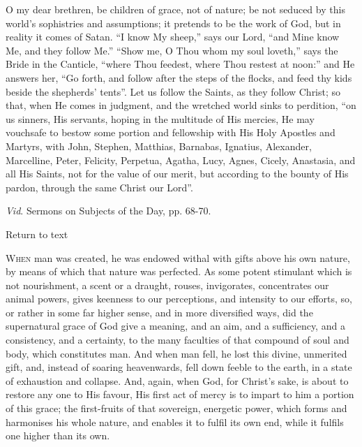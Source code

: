 O my dear brethren, be children of grace, not of nature; be not
seduced by this world's sophistries and assumptions; it pretends to be
the work of God, but in reality it comes of Satan. ``I know My
sheep,'' says our Lord, ``and Mine know Me, and they follow
Me.'' ``Show me, O Thou whom my soul loveth,'' says the
Bride in the Canticle, ``where Thou feedest, where Thou restest at
noon:'' and He answers her, ``Go forth, and follow after the
steps of the flocks, and feed thy kids beside the shepherds'
tents''. Let us follow the Saints, as they follow Christ; so that,
when He comes in judgment, and the wretched world sinks to perdition,
``on us sinners, His servants, hoping in the multitude of His
mercies, He may vouchsafe to bestow some portion and fellowship with
His Holy Apostles and Martyrs, with John, Stephen, Matthias, Barnabas,
Ignatius, Alexander, Marcelline, Peter, Felicity, Perpetua, Agatha,
Lucy, Agnes, Cicely, Anastasia, and all His Saints, not for the value
of our merit, but according to the bounty of His pardon, through the
same Christ our Lord''.


\emph{Vid}. Sermons on Subjects of the
Day, pp. 68-70.

Return to text


W\textsc{hen} man was created, he was endowed withal with gifts above his
own nature, by means of which that nature was perfected. As some
potent stimulant which is not nourishment, a scent or a draught,
rouses, invigorates, concentrates our animal powers, gives keenness to
our perceptions, and intensity to our efforts, so, or rather in some
far higher sense, and in more diversified ways, did the supernatural
grace of God give a meaning, and an aim, and a sufficiency, and a
consistency, and a certainty, to the many faculties of that compound
of soul and body, which constitutes man. And when man fell, he lost
this divine, unmerited gift, and, instead of soaring heavenwards, fell
down feeble to the earth, in a state of exhaustion and collapse. And,
again, when God, for Christ's sake, is about to restore any one to His
favour, His first act of mercy is to impart to him a portion of this
grace; the first-fruits of that sovereign, energetic power, which
forms and harmonises his whole nature, and enables it to fulfil its
own end, while it fulfils one higher than its own.

